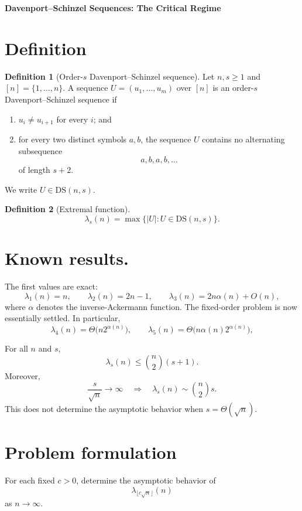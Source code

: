\documentclass[11pt,a4paper]{article}
\theoremstyle{definition}
\newtheorem{definition}{Definition}
\begin{document}
\begin{center}
  {\Large\bfseries Davenport--Schinzel Sequences: The Critical Regime}
\end{center}
\section{Definition}
\begin{definition}[Order-$s$ Davenport--Schinzel sequence]
Let $n,s\geq 1$ and $[n]=\{1,\ldots,n\}$. A sequence
$U=(u_1,\ldots,u_m)$ over $[n]$ is an order-$s$ Davenport--Schinzel sequence if
\begin{enumerate}
  \item $u_i\neq u_{i+1}$ for every $i$; and
  \item for every two distinct symbols $a,b$, the sequence $U$ contains no
  alternating subsequence
  \[
    a,b,a,b,\ldots
  \]
  of length $s+2$.
\end{enumerate}
We write $U\in\mathrm{DS}(n,s)$.
\end{definition}

\begin{definition}[Extremal function]
\begin{equation}
  \lambda_s(n)
  =\max\bigl\{|U|:U\in\mathrm{DS}(n,s)\bigr\}.
\end{equation}
\end{definition}

\section{Known results.}
The first values are exact:
\begin{equation}\label{eq:small-orders}
 \lambda_1(n)=n,\qquad \lambda_2(n)=2n-1,\qquad
 \lambda_3(n)=2n\alpha(n)+O(n),
\end{equation}
where $\alpha$ denotes the inverse-Ackermann function.  The fixed-order problem is
now essentially settled.  In particular,
\begin{equation}\label{eq:fixed-order}
 \lambda_4(n)=\Theta\!\bigl(n2^{\alpha(n)}\bigr),\qquad
 \lambda_5(n)=\Theta\!\bigl(n\alpha(n)2^{\alpha(n)}\bigr),
\end{equation}

For all $n$ and $s$,
\begin{equation}
  \lambda_s(n)\leq \binom{n}{2}(s+1).
\end{equation}
Moreover,
\begin{equation}
  \frac{s}{\sqrt n}\longrightarrow\infty
  \quad\Longrightarrow\quad
  \lambda_s(n)\sim\binom{n}{2}s.
\end{equation}
This does not determine the asymptotic behavior when $s=\Theta(\sqrt n)$.

\section{Problem formulation}
For each fixed $c>0$, determine the asymptotic behavior of
\begin{equation}
  \lambda_{\lfloor c\sqrt n\rfloor}(n)
\end{equation}
as $n\to\infty$.
\end{document}
